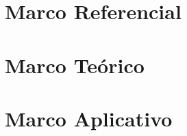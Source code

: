 \documentclass[letterpaper, oneside, 12pt]{book}
\begin{document}
	\frontmatter
		\tableofcontents
	\mainmatter
		\part{Marco Referencial}
		
		\part{Marco Te\'orico}
		
		
		\part{Marco Aplicativo}
		
		
		
	\backmatter
		
		
\end{document}
